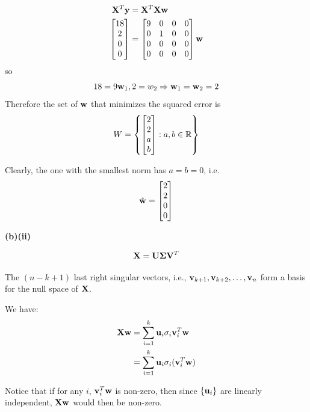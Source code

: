 \documentclass[a4paper, 12pt]{article}
\begin{document}
\begin{solution}
    \begin{align*}
        \mathbf{X}^T \mathbf{y}     & = \mathbf{X}^T \mathbf{X} \mathbf{w} \\
        \begin{bmatrix}
            18 \\
            2  \\
            0  \\
            0
        \end{bmatrix} & = \begin{bmatrix}
                              9 & 0 & 0 & 0 \\
                              0 & 1 & 0 & 0 \\
                              0 & 0 & 0 & 0 \\
                              0 & 0 & 0 & 0
                          \end{bmatrix} \mathbf{w}
    \end{align*}
    so \[
        18 = 9\mathbf{w}_1, 2 = w_2 \Rightarrow \mathbf{w}_1 = \mathbf{w}_2 = 2
    \]
    Therefore the set of $\mathbf{w}$ that minimizes the squared error is \[
        W = \left\{\begin{bmatrix}
            2 \\2\\a\\b
        \end{bmatrix} : a, b \in \mathbb{R}\right\}
    \]

    Clearly, the one with the smallest norm has $a = b = 0$, i.e. \[
        \hat{\mathbf{w}} = \begin{bmatrix}
            2 \\2 \\ 0 \\0
        \end{bmatrix}
    \]

    \textbf{(b)(ii)}

    \[\mathbf{X} = \mathbf{U} \mathbf{\Sigma} \mathbf{V}^T\]

    The $(n-k+1)$ last right singular vectors, i.e., $\mathbf{v}_{k+1}, \mathbf{v}_{k+2}, \dots, \mathbf{v}_n$ form a basis for the null space of $\mathbf{X}$.

    We have:
    \begin{align*}
        \mathbf{X} \mathbf{w} & = \sum_{i=1}^{k} \mathbf{u}_i \sigma_i \mathbf{v}_i^T \mathbf{w}   \\
                  & = \sum_{i=1}^{k} \mathbf{u}_i \sigma_i (\mathbf{v}_i^T \mathbf{w})
    \end{align*}

    Notice that if for any $i$, $\mathbf{v}_i^T \mathbf{w}$ is non-zero, then since $\{\mathbf{u}_i\}$ are linearly independent, $\mathbf{X} \mathbf{w}$ would then be non-zero.


\end{solution}
\end{document}
